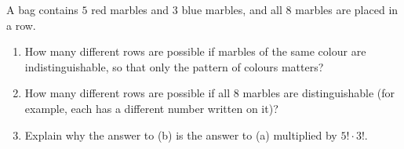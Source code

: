 A bag contains $5$ red marbles and $3$ blue marbles, and all $8$ marbles are placed in a row.
\begin{enumerate}
\item[(a)] How many different rows are possible if marbles of the same colour are indistinguishable, so that only the pattern of colours matters?
\item[(b)] How many different rows are possible if all $8$ marbles are distinguishable (for example, each has a different number written on it)?
\item[(c)] Explain why the answer to (b) is the answer to (a) multiplied by $5!\cdot3!$.
\end{enumerate}
